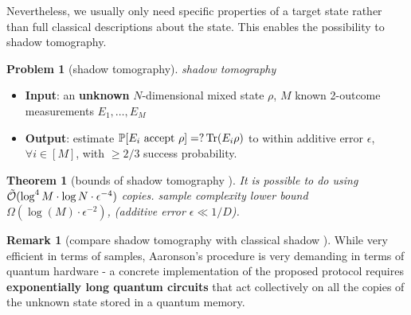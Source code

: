\documentclass[
reprint,
aps,
pra,
floatfix,
]{revtex4-2}
\theoremstyle{plain}
\newtheorem{theorem}{Theorem}
\theoremstyle{definition}
\newtheorem{problem}{Problem}
\newtheorem{remark}{Remark}
\newcommand{\dm}{\rho}
\begin{document}
Nevertheless, we usually only need specific properties of a target state rather than full classical descriptions about the state.
This enables the possibility to shadow tomography.
\begin{problem}[shadow tomography]\label{prm:shadow_tomography}
	\emph{shadow tomography}
	\begin{itemize}
		\item \textbf{Input}: an \textbf{unknown} $N$-dimensional mixed state $\rho$, $M$ known 2-outcome measurements $E_1,\dots,E_M$
		\item \textbf{Output}: estimate $\probability[E_i \text{ accept } \dm]=?\Tr(E_i \dm)$ to within additive error $\epsilon$, $\forall i\in [M]$, with $\ge 2/3$ success probability.	
	\end{itemize}
\end{problem}
\begin{theorem}[bounds of shadow tomography \cite{aaronsonShadowTomographyQuantum2018}]\label{thm:shadow_tomography}
	It is possible to do  using $\tilde{\mathcal{O}}(\log^4 M\cdot \log N\cdot\epsilon^{-4})$ copies.
	sample complexity lower bound $\Omega(\log (M) \cdot \epsilon^{-2})$, 
	(additive error $\epsilon\ll 1/D$).
\end{theorem}
\begin{remark}[compare shadow tomography with classical shadow \cite{huangPredictingManyProperties2020}]
	While very efficient in terms of samples, Aaronson's procedure is very demanding in terms of quantum hardware - a concrete implementation of the proposed protocol requires \textbf{exponentially long quantum circuits} that act collectively on all the copies of the unknown state stored in a quantum memory.
\end{remark}
\end{document}
